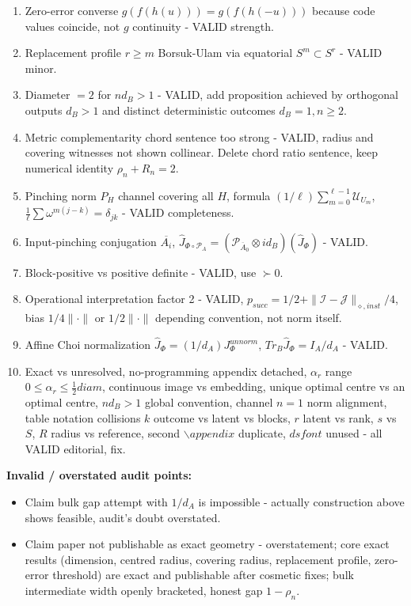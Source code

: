 \documentclass[11pt,a4paper]{article}
\begin{document}
\begin{enumerate}
\item Zero-error converse $g(f(h(u)))=g(f(h(-u)))$ because code values coincide, not $g$ continuity - VALID strength.
\item Replacement profile $r\ge m$ Borsuk-Ulam via equatorial $S^m\subset S^r$ - VALID minor.
\item Diameter $=2$ for $nd_B>1$ - VALID, add proposition achieved by orthogonal outputs $d_B>1$ and distinct deterministic outcomes $d_B=1,n\ge2$.
\item Metric complementarity chord sentence too strong - VALID, radius and covering witnesses not shown collinear. Delete chord ratio sentence, keep numerical identity $\rho_n+R_n=2$.
\item Pinching norm $P_H$ channel covering all $H$, formula $(1/\ell)\sum_{m=0}^{\ell-1}\mathcal U_{U_m}$, $\frac1\ell\sum\omega^{m(j-k)}=\delta_{jk}$ - VALID completeness.
\item Input-pinching conjugation $\overline{A_i}$, $\widehat J_{\Phi\circ\mathcal P_A}=(\mathcal P_{\overline A_0}\otimes id_B)(\widehat J_\Phi)$ - VALID.
\item Block-positive vs positive definite - VALID, use $\succ0$.
\item Operational interpretation factor 2 - VALID, $p_{succ}=1/2+\|\mathcal I-\mathcal J\|_{\diamond,inst}/4$, bias $1/4\|\cdot\|$ or $1/2\|\cdot\|$ depending convention, not norm itself.
\item Affine Choi normalization $\widehat J_\Phi=(1/d_A)J^{unnorm}_\Phi$, $Tr_B\widehat J_\Phi=I_A/d_A$ - VALID.
\item Exact vs unresolved, no-programming appendix detached, $\alpha_r$ range $0\le\alpha_r\le\frac12diam$, continuous image vs embedding, unique optimal centre vs an optimal centre, $nd_B>1$ global convention, channel $n=1$ norm alignment, table notation collisions $k$ outcome vs latent vs blocks, $r$ latent vs rank, $s$ vs $S$, $R$ radius vs reference, second $\backslash appendix$ duplicate, $dsfont$ unused - all VALID editorial, fix.
\end{enumerate}

\textbf{Invalid / overstated audit points:}
\begin{itemize}
\item Claim bulk gap attempt with $1/d_A$ is impossible - actually construction above shows feasible, audit's doubt overstated.
\item Claim paper not publishable as exact geometry - overstatement; core exact results (dimension, centred radius, covering radius, replacement profile, zero-error threshold) are exact and publishable after cosmetic fixes; bulk intermediate width openly bracketed, honest gap $1-\rho_n$.
\end{itemize}
\end{document}
